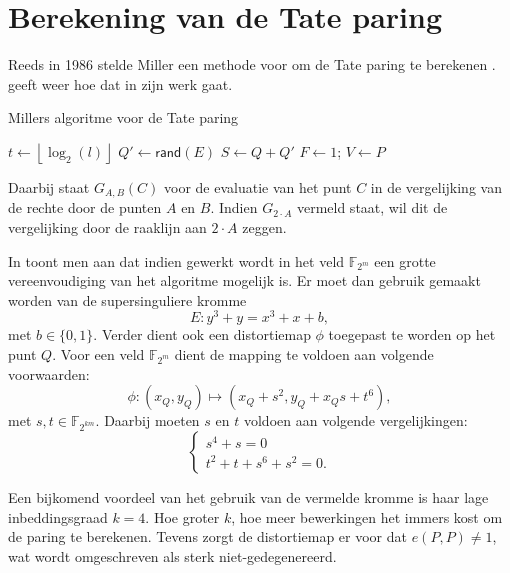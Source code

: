 \section{Berekening van de Tate paring\label{sectie-paringen-berekening}}

Reeds in 1986 stelde Miller een methode voor om de Tate paring te berekenen \cite{miller, barreto-efficient}.  geeft weer hoe dat in zijn werk gaat.

\begin{algorithm}[h]
	\caption{Millers algoritme voor de Tate paring}
	\label{algoritme-paringen-miller}
	$t \gets \left\lfloor \log _2 (l) \right\rfloor$\;
	$Q' \gets \textsf{rand}(E)$\;
	$S \gets Q + Q'$\;
	$F \gets 1$; $V \gets P$\;	
\end{algorithm}

Daarbij staat $G_{A, B}(C)$ voor de evaluatie van het punt $C$ in de vergelijking van de rechte door de punten $A$ en $B$. Indien $G_{2 \cdot A}$ vermeld staat, wil dit de vergelijking door de raaklijn aan $2 \cdot A$ zeggen.

In \cite{barreto-efficient} toont men aan dat indien gewerkt wordt in het veld $\mathbb{F}_{2^m}$ een grotte vereenvoudiging van het algoritme mogelijk is. Er moet dan gebruik gemaakt worden van de supersinguliere kromme
\[E: y^3 + y = x^3 + x + b,\]
met $b \in \{0, 1\}$. Verder dient ook een distortiemap $\phi$ toegepast te worden op het punt $Q$. Voor een veld $\mathbb{F}_{2^m}$ dient de mapping te voldoen aan volgende voorwaarden:
\[\phi : (x_Q, y_Q) \mapsto (x_Q + s^2, y_Q + x_Q s + t^6),\]
met $s, t \in \mathbb{F}_{2^{km}}$. Daarbij moeten $s$ en $t$ voldoen aan volgende vergelijkingen:
\[\begin{cases}
s^4 + s = 0\\
t^2 + t + s^6 + s^2 = 0.
\end{cases}\]

Een bijkomend voordeel van het gebruik van de vermelde kromme is haar lage inbeddingsgraad $k = 4$. Hoe groter $k$, hoe meer bewerkingen het immers kost om de paring te berekenen. Tevens zorgt de distortiemap er voor dat $e(P, P) \neq 1$, wat wordt omgeschreven als sterk niet-gedegenereerd.


